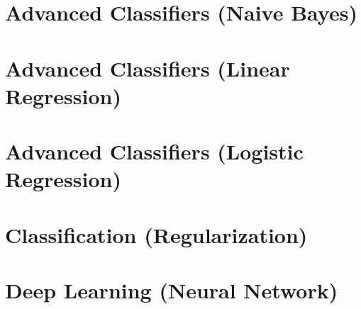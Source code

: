 \documentclass{notesclass}
\begin{document}
\chapter{Advanced Classifiers (Naive Bayes)}


\chapter{Advanced Classifiers (Linear Regression)}


\chapter{Advanced Classifiers (Logistic Regression)}


\chapter{Classification (Regularization)}


\chapter{Deep Learning (Neural Network)}



\end{document}
